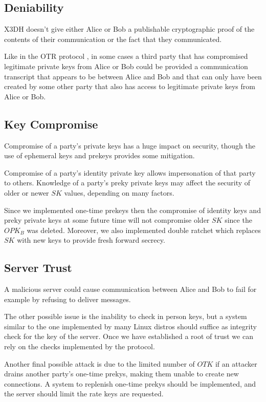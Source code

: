 \subsection{Deniability}
\label{subsec:Deniability}

X3DH doesn’t give either Alice or Bob a publishable cryptographic proof of the contents of their communication or the fact that they communicated.

Like in the OTR protocol \cite{OTR}, in some cases a third party that has compromised legitimate private keys from Alice or Bob could be provided a communication transcript that appears to be between Alice and Bob and that can only have been created by some other party that also has access to legitimate private keys from Alice or Bob.

\subsection{Key Compromise}
\label{subsec:KeyCompromise}

Compromise of a party's private keys has a huge impact on security, though the use of ephemeral keys and prekeys provides some mitigation.

Compromise of a party's identity private key allows impersonation of that party to others. Knowledge of a party's preky private keys may affect the security of older or newer $SK$ values, depending on many factors.

Since we implemented one-time prekeys then the compromise of identity keys and preky private keys at some future time will not compromise older $SK$ since the $OPK_B$ was deleted. Moreover, we also implemented double ratchet which replaces $SK$ with new keys to provide fresh forward secrecy.

\subsection{Server Trust}
\label{subsec:ServerTrust}

A malicious server could cause communication between Alice and Bob to fail for example by refusing to deliver messages.

The other possible issue is the inability to check in person keys, but a system similar to the one implemented by many Linux distros should suffice as integrity check for the key of the server. Once we have established a root of trust we can rely on the checks implemented by the protocol.

Another final possible attack is due to the limited number of $OTK$ if an attacker drains another party's one-time prekys, making them unable to create new connections. A system to replenish one-time prekys should be implemented, and the server should limit the rate keys are requested.

